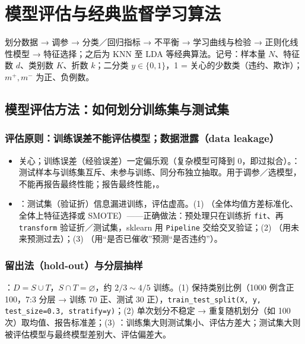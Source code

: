 \chapter{模型评估与经典监督学习算法}
\noindent{}\quad 划分数据 → 调参 → 分类／回归指标 → 不平衡 → 学习曲线与检验 → 正则化线性模型 → 特征选择；之后为 KNN 至 LDA 等经典算法。记号：样本量 $N$、特征数 $d$、类别数 $K$、折数 $k$；二分类 $y\in\{0,1\}$，1 = 关心的少数类（违约、欺诈）；$m^+,m^-$ 为正、负例数。

\section{模型评估方法：如何划分训练集与测试集}

\subsection{评估原则：训练误差不能评估模型；数据泄露（data leakage）}
\begin{itemize}
\item 关心；训练误差（经验误差）一定偏乐观（复杂模型可降到 0，即过拟合）。：测试样本与训练集互斥、未参与训练、同分布独立抽取。用于调参／选模型，不能再报告最终性能；报告最终性能，。
\item {}：测试集（验证折）信息漏进训练，评估虚高。(1) （全体均值方差标准化、全体上特征选择或 SMOTE）——正确做法：预处理只在训练折 \texttt{fit}、再 \texttt{transform} 验证折／测试集，sklearn 用 \texttt{Pipeline} 交给交叉验证；(2) （用未来预测过去）；(3) （用“是否已催收”预测“是否违约”）。
\end{itemize}

\subsection{留出法（hold-out）与分层抽样}
：$D=S\cup T$，$S\cap T=\varnothing$，约 $2/3\sim4/5$ 训练。(1) 保持类别比例（1000 例含正 100，7:3 分层 → 训练 70 正、测试 30 正），\texttt{train\_test\_split(X, y, test\_size=0.3, stratify=y)}；(2) 单次划分不稳定 → 重复随机划分（如 100 次）取均值、报告标准差；(3) ：训练集大则测试集小、评估方差大；测试集大则被评估模型与最终模型差别大、评估偏差大。

